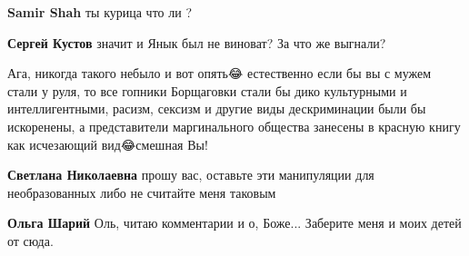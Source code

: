 \begin{itemize}
\begin{itemize}
 
\textbf{Samir Shah} ты курица что ли ?

 
\textbf{Сергей Кустов} значит и Янык был не виноват? За что же выгнали?

 

Ага, никогда такого небыло и вот опять😂 естественно если бы вы с мужем стали у
руля, то все гопники Борщаговки стали бы дико культурными и интеллигентными,
расизм, сексизм и другие виды дескриминации были бы искоренены, а представители
маргинального общества занесены в красную книгу как исчезающий вид😂смешная Вы!


 
\textbf{Светлана Николаевна} прошу вас, оставьте эти манипуляции для необразованных либо не считайте меня таковым

 
\textbf{Ольга Шарий} Оль, читаю комментарии и о, Боже... Заберите меня и моих детей от сюда.

 

\end{itemize}
\end{itemize}

